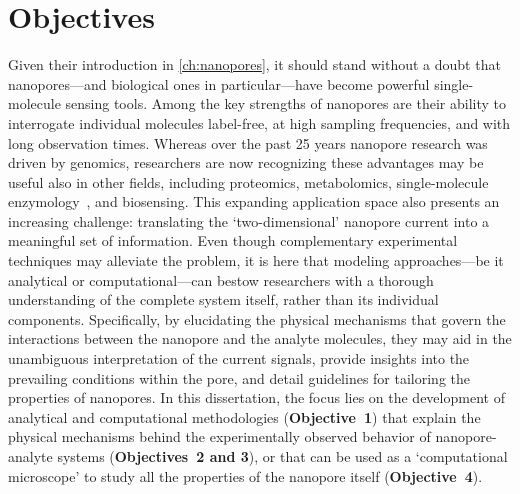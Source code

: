\chapter{Objectives}
%
\label{ch:objectives}
%



Given their introduction in \cref{ch:nanopores}, it should stand without a doubt that nanopores---and biological
ones in particular---have become powerful single-molecule sensing tools. Among the key strengths of nanopores
are their ability to interrogate individual molecules label-free, at high sampling frequencies, and with long
observation times. Whereas over the past 25 years nanopore research was driven by genomics, researchers are
now recognizing these advantages may be useful also in other fields, including proteomics, metabolomics,
single-molecule enzymology~\cite{Willems-VanMeervelt-2017}, and biosensing. This expanding application space
also presents an increasing challenge: translating the `two-dimensional' nanopore current into a meaningful
set of information. Even though complementary experimental techniques may alleviate the problem, it is here
that modeling approaches---be it analytical or computational---can bestow researchers with a thorough
understanding of the complete system itself, rather than its individual components. Specifically, by
elucidating the physical mechanisms that govern the interactions between the nanopore and the analyte
molecules, they may aid in the unambiguous interpretation of the current signals, provide insights into the
prevailing conditions within the pore, and detail guidelines for tailoring the properties of nanopores. In
this dissertation, the focus lies on the development of analytical and computational methodologies
(\textbf{Objective~1}) that explain the physical mechanisms behind the experimentally observed behavior of
nanopore-analyte systems (\textbf{Objectives~2 and 3}), or that can be used as a `computational microscope' to
study all the properties of the nanopore itself (\textbf{Objective~4}).

\clearpage
%
%

